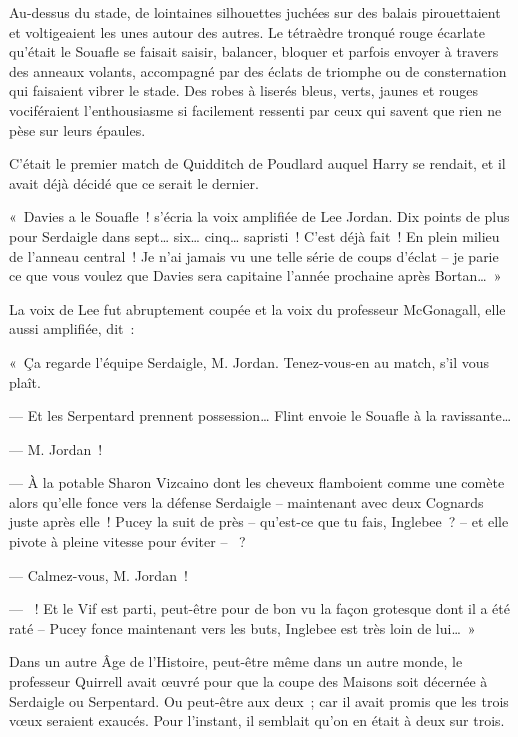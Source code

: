 \later

Au-dessus du stade, de lointaines silhouettes juchées sur des balais pirouettaient et voltigeaient les unes autour des autres.
Le tétraèdre tronqué rouge écarlate qu'était le Souafle se faisait saisir, balancer, bloquer et parfois envoyer à travers des anneaux volants, accompagné par des éclats de triomphe ou de consternation qui faisaient vibrer le stade.
Des robes à liserés bleus, verts, jaunes et rouges vociféraient l'enthousiasme si facilement ressenti par ceux qui savent que rien ne pèse sur leurs épaules.

C'était le premier match de Quidditch de Poudlard auquel Harry se rendait, et il avait déjà décidé que ce serait le dernier.

«~Davies a le Souafle~! s'écria la voix amplifiée de Lee Jordan.
Dix points de plus pour Serdaigle dans sept… six… cinq… sapristi~!
C'est déjà fait~!
En plein milieu de l'anneau central~!
Je n'ai jamais vu une telle série de coups d'éclat -- je parie ce que vous voulez que Davies sera capitaine l'année prochaine après Bortan…~»

La voix de Lee fut abruptement coupée et la voix du professeur McGonagall, elle aussi amplifiée, dit~:

«~Ça regarde l'équipe Serdaigle, M. Jordan.
Tenez-vous-en au match, s'il vous plaît.

--- Et les Serpentard prennent possession…
Flint envoie le Souafle à la ravissante…

--- M. Jordan~!

--- À la potable Sharon Vizcaino dont les cheveux flamboient comme une comète alors qu'elle fonce vers la défense Serdaigle -- maintenant avec deux Cognards juste après elle~!
Pucey la suit de près -- qu'est-ce que tu fais, Inglebee~?
-- et elle pivote à pleine vitesse pour éviter -- ~?

--- Calmez-vous, M. Jordan~!

--- ~!
Et le Vif est parti, peut-être pour de bon vu la façon grotesque dont il a été raté -- Pucey fonce maintenant vers les buts, Inglebee est très loin de lui…~»

Dans un autre Âge de l'Histoire, peut-être même dans un autre monde, le professeur Quirrell avait œuvré pour que la coupe des Maisons soit décernée à Serdaigle ou Serpentard.
Ou peut-être aux deux~; car il avait promis que les trois vœux seraient exaucés.
Pour l'instant, il semblait qu'on en était à deux sur trois.


